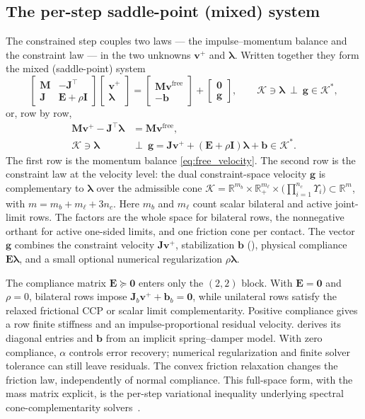 \documentclass{article}
\newcommand{\M}{\mathbf{M}}
\newcommand{\Jac}{\mathbf{J}}
\newcommand{\Ecomp}{\mathbf{E}}       %
\newcommand{\vv}{\mathbf{v}}
\newcommand{\vfree}{\mathbf{v}^{\mathrm{free}}}
\newcommand{\blam}{\boldsymbol{\lambda}}
\newcommand{\cone}{\Upsilon}
\newcommand{\Kadm}{\mathcal{K}}          %
\newcommand{\Rbb}{\mathbb{R}}
\newcommand{\gvel}{\mathbf{g}}           %
\newcommand{\stab}{\mathbf{b}}           %
\newcommand{\reg}{\rho}                  %
\newcommand{\Id}{\mathbf{I}}
\theoremstyle{plain}
\theoremstyle{definition}
\begin{document}
\subsection{The per-step saddle-point (mixed) system}
\label{sec:saddle}
The constrained step couples two laws --- the impulse--momentum balance and the
constraint law --- in the two unknowns $\vv^{+}$ and $\blam$. Written together
they form the mixed (saddle-point) system
\begin{equation}
\begin{bmatrix}\M & -\Jac^{\top}\\[2pt] \Jac & \Ecomp+\reg\Id\end{bmatrix}
\begin{bmatrix}\vv^{+}\\[2pt] \blam\end{bmatrix}
=
\begin{bmatrix}\M\vfree\\[2pt] -\stab\end{bmatrix}
+
\begin{bmatrix}\mathbf 0\\[2pt] \gvel\end{bmatrix},
\qquad
\Kadm\ni\blam \ \perp\ \gvel\in\Kadm^{*},
\label{eq:saddle}
\end{equation}
or, row by row,
\begin{align}
\M\vv^{+}-\Jac^{\top}\blam &= \M\vfree, \label{eq:saddle_mom}\\
\Kadm\ni\blam \ &\perp\ \gvel=\Jac\vv^{+}+(\Ecomp+\reg\Id)\blam+\stab\in\Kadm^{*}.
\label{eq:saddle_con}
\end{align}
The first row is the momentum balance \eqref{eq:free_velocity}. The second row is
the constraint law at the velocity level: the dual constraint-space velocity
$\gvel$ is complementary to $\blam$ over the admissible cone
$\Kadm=\Rbb^{m_b}\times\Rbb_+^{m_\ell}\times
\bigl(\textstyle\prod_{i=1}^{n_c}\cone_i\bigr)\subset\Rbb^m$, with
$m=m_b+m_\ell+3n_c$. Here $m_b$ and $m_\ell$ count scalar bilateral and active
joint-limit rows. The factors are the whole space for bilateral
rows, the nonnegative orthant for active one-sided limits, and one friction
cone per contact. The vector $\gvel$ combines the constraint velocity
$\Jac\vv^{+}$, stabilization $\stab$ (), physical compliance
$\Ecomp\blam$, and a small optional numerical regularization $\reg\blam$.

The compliance matrix $\Ecomp\succeq\mathbf 0$ enters only the $(2,2)$ block.
With $\Ecomp=\mathbf0$ and $\reg=0$, bilateral rows impose
$\Jac_b\vv^{+}+\stab_b=\mathbf0$, while unilateral rows satisfy the relaxed
frictional CCP or scalar limit complementarity. Positive compliance gives a
row finite stiffness and an impulse-proportional residual velocity.
 derives its diagonal entries and $\stab$ from an implicit
spring--damper model. With zero compliance, $\alpha$ controls error recovery;
numerical regularization and finite solver tolerance can still leave residuals.
The convex friction relaxation changes the friction law, independently of
normal compliance. This full-space form, with the mass matrix
explicit, is the per-step variational inequality underlying spectral
cone-complementarity solvers~\cite{tasora2011,tasora2013pspgfb}.
\end{document}
